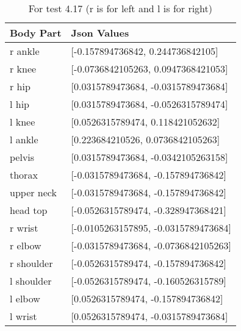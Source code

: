 \documentclass{scrreprt}
\begin{document}
\begin{table}[H]
    \centering
    \caption{For test 4.17 (r is for left and l is for right)}
    \begin{tabular}{||p{2cm}|p{6.5cm}||}
        \hline
        \textbf{Body Part} & \textbf {Json Values}\\
         \hline\hline
        r ankle & [-0.157894736842, 0.244736842105] \\
        \hline
        r knee & [-0.0736842105263, 0.0947368421053] \\
        \hline
        r hip & [0.0315789473684, -0.0315789473684] \\
        \hline
        l hip & [0.0315789473684, -0.0526315789474] \\
        \hline
        l knee & [0.0526315789474, 0.118421052632] \\
        \hline
        l ankle & [0.223684210526, 0.0736842105263] \\
        \hline
        pelvis & [0.0315789473684, -0.0342105263158]\\
        \hline
        thorax & [-0.0315789473684, -0.157894736842] \\
        \hline
        upper neck & [-0.0315789473684, -0.157894736842] \\
        \hline
        head top & [-0.0526315789474, -0.328947368421] \\
        \hline
        r wrist & [-0.0105263157895, -0.0315789473684] \\
        \hline
        r elbow & [-0.0315789473684, -0.0736842105263] \\
        \hline
        r shoulder & [-0.0526315789474, -0.157894736842] \\
        \hline
        l shoulder & [-0.0526315789474, -0.160526315789]\\
        \hline
        l elbow & [0.0526315789474, -0.157894736842] \\
        \hline
        l wrist & [0.0526315789474, -0.0315789473684] \\
        \hline
    \end{tabular}
\end{table}
\end{document}
